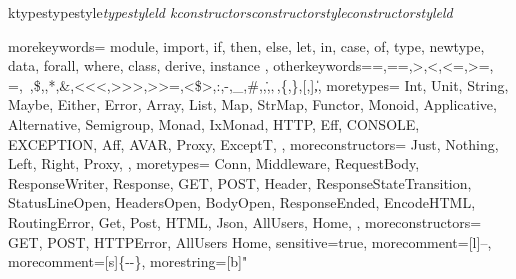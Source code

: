 \makeatletter
\lst@InstallKeywords k{types}{typestyle}\slshape{typestyle}{}ld
\lst@InstallKeywords k{constructors}{constructorstyle}\slshape{constructorstyle}{}ld
\makeatother

{
  morekeywords={
    module,
    import,
    if,
    then,
    else,
    let,
    in,
    case,
    of,
    type,
    newtype,
    data,
    forall,
    where,
    class,
    derive,
    instance
  },
  otherkeywords={=,==,>,<,<=,>=,\\=,~,\$,\@,*,\&,<<<,>>>,>>=,<\$>,:,-,_,\#,\/,\.,\(,\),\{,\},[,],\|},
  moretypes={
    Int,
    Unit,
    String,
    Maybe,
    Either,
    Error,
    Array,
    List,
    Map,
    StrMap,
    Functor,
    Monoid,
    Applicative,
    Alternative,
    Semigroup,
    Monad,
    IxMonad,
    HTTP,
    Eff,
    CONSOLE,
    EXCEPTION,
    Aff,
    AVAR,
    Proxy,
    ExceptT,
  },
  moreconstructors={
    Just,
    Nothing,
    Left,
    Right,
    Proxy,
  },
  moretypes={
    Conn,
    Middleware,
    RequestBody,
    ResponseWriter,
    Response,
    GET,
    POST,
    Header,
    ResponseStateTransition,
    StatusLineOpen,
    HeadersOpen,
    BodyOpen,
    ResponseEnded,
    EncodeHTML,
    RoutingError,
    Get,
    Post,
    HTML,
    Json,
    AllUsers,
    Home,
  },
  moreconstructors={
    GET,
    POST,
    HTTPError,
    AllUsers
    Home,
  }
  sensitive=true,
  morecomment=[l]{--}, %
  morecomment=[s]{\{-}{-\}}, %
  morestring=[b]" %
}
